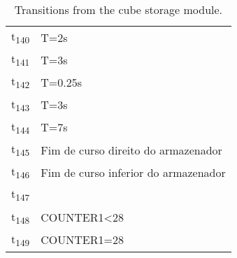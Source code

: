\begin{table}[htbp]
\caption{Transitions from the cube storage module.}
\centering
\begin{tabular}{ll}
t\textsubscript{140} & T=2s\\
t\textsubscript{141} & T=3s\\
t\textsubscript{142} & T=0.25s\\
t\textsubscript{143} & T=3s\\
t\textsubscript{144} & T=7s\\
t\textsubscript{145} & Fim de curso direito do armazenador\\
t\textsubscript{146} & Fim de curso inferior do armazenador\\
t\textsubscript{147} & \\
t\textsubscript{148} & COUNTER1<28\\
t\textsubscript{149} & COUNTER1=28\\
\end{tabular}
\end{table}
